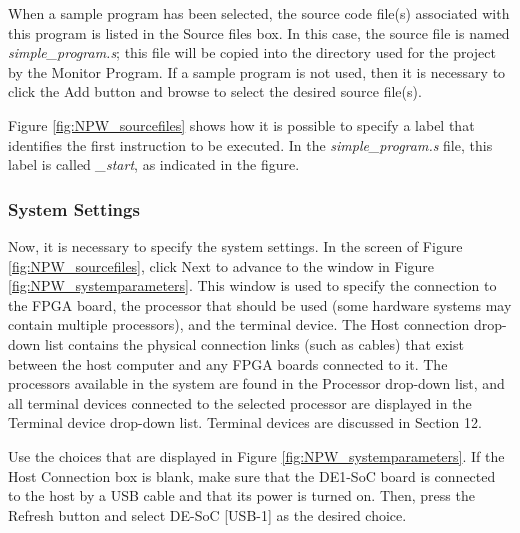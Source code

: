 \documentclass[11pt, twoside, pdftex]{article}
\begin{document}
When a sample program has been
selected, the source code file(s) associated with this program
is listed in the {\sf Source files} box.  In this case, the source file is named {\it simple\_program.s}; this
file will be copied into the directory used for the project by
the Monitor Program. 
If a sample program is not used, then it is necessary to click
the {\sf Add} button and browse to select the desired source 
file(s).

Figure \ref{fig:NPW_sourcefiles} shows how it is possible to specify a label
that identifies the first instruction to be executed. 
In the {\it simple\_program.s} file, this label is called 
{\it \_start}, as indicated in the figure.

\subsubsection{System Settings}

Now, it is necessary to specify the system settings.
In the screen of Figure \ref{fig:NPW_sourcefiles}, click {\sf Next} to advance to the
window in Figure \ref{fig:NPW_systemparameters}.
This window is used to specify the connection to the FPGA board, the processor that should be used (some hardware systems may
contain multiple processors), and the terminal device.
The {\sf Host connection} drop-down list contains the physical
connection links (such as cables) that exist between the host computer and any FPGA boards connected to it. 
The processors available in the system are found in the 
{\sf Processor} drop-down list, and all 
terminal devices connected to the selected processor are displayed in the {\sf Terminal device} drop-down list. 
Terminal devices are discussed in Section 12.

Use the choices that are displayed in Figure \ref{fig:NPW_systemparameters}. If the Host Connection box is blank, make sure that 
the DE1-SoC board is connected to the host by a USB cable and
that its power is turned on. Then, press the {\sf Refresh} button and select DE-SoC [USB-1] as the desired choice.
\end{document}
